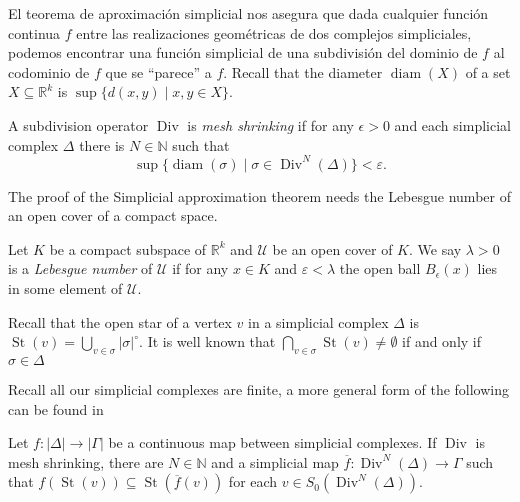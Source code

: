 \documentclass{standalone}
\begin{document}
	El teorema de aproximación simplicial nos asegura que dada cualquier función continua $f$ entre las realizaciones geométricas de dos complejos simpliciales,  podemos encontrar una función simplicial de una subdivisión del dominio de $f$ al codominio de $f$ que se ``parece'' a $f$. Recall that the diameter $\operatorname{diam}(X)$ of a set $X\subseteq\mathbb{R}^{k}$ is $\sup\{d(x,y)\mid x,y\in X\}$.
	\begin{definition}\label{def:mesh}
		A subdivision operator $\operatorname{Div}$ is \emph{mesh shrinking} if for any $\epsilon>0$ and each simplicial complex $\Delta$ there is $N\in\mathbb{N}$ such that \[\sup\{\operatorname{diam}(\sigma)\mid\sigma\in\operatorname{Div}^{N}(\Delta)\}<\varepsilon.\]
	\end{definition}
	The proof of the Simplicial approximation theorem needs the Lebesgue number of an open cover of a compact space.
	
	\begin{definition}\label{def:lebesgue}
		Let $K$ be a compact subspace of $\mathbb{R}^{k}$ and $\mathcal{U}$ be an open cover of $K$. We say $\lambda>0$ is a \emph{Lebesgue number} of $\mathcal{U}$ if for any $x\in K$ and $\varepsilon<\lambda$ the open ball $B_{\epsilon}(x)$ lies in some element of $\mathcal{U}$.
	\end{definition}
	\begin{remark}\label{rem:stars}
		Recall that the open star of a vertex $v$ in a simplicial complex $\Delta$ is $\operatorname{St}(v)=\bigcup_{v\in\sigma}|\sigma|^{\circ}$. It is well known that $\bigcap_{v\in \sigma}\operatorname{St}(v)\neq\emptyset$ if and only if $\sigma\in\Delta$ 
	\end{remark}
	Recall all our simplicial complexes are finite, a more general form of the following can be found in \cite[Theorem 16.5]{munkres:1984:algebraic:topology} 
	\begin{theorem}\label{thm:simp_app}
		Let $f\colon|\Delta|\rightarrow|\Gamma|$ be a continuous map between simplicial complexes. If $\operatorname{Div}$ is mesh shrinking, there are $N\in\mathbb{N}$ and a simplicial map $\overline{f}\colon\operatorname{Div}^{N}(\Delta)\rightarrow\Gamma$ such that $f(\operatorname{St}(v))\subseteq\operatorname{St}(\overline{f}(v))$ for each $v\in S_{0}(\operatorname{Div}^{N}(\Delta))$.
	\end{theorem}
	
\end{document}
